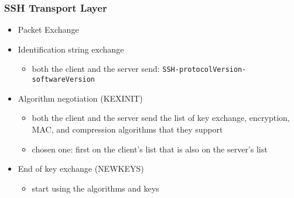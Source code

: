 \documentclass[final]{article}
\begin{document}
\subsubsection*{SSH Transport Layer}
\begin{itemize}
    \item Packet Exchange
    \item Identification string exchange
          \begin{itemize}[nosep]
              \item both the client and the server send: \texttt{SSH-protocolVersion-softwareVersion}
          \end{itemize}
    \item Algorithm negotiation (KEXINIT)
          \begin{itemize}[nosep]
              \item both the client and the server send the list of key exchange, encryption, MAC, and compression algorithms that they support
              \item chosen one: first on the client's list that is also on the server's list
          \end{itemize}
    \item End of key exchange (NEWKEYS)
          \begin{itemize}[nosep]
              \item start using the algorithms and keys
          \end{itemize}
\end{itemize}
\end{document}
